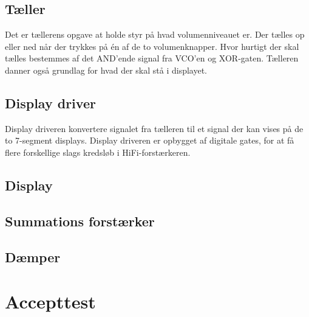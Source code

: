 \subsection{Tæller}
\label{volumenkontrol-simulering-taeller}

Det er tællerens opgave at holde styr på hvad volumenniveauet er. Der tælles op eller ned når der trykkes på én af de to volumenknapper. Hvor hurtigt der skal tælles bestemmes af det AND'ende signal fra VCO'en og XOR-gaten. Tælleren danner også grundlag for hvad der skal stå i displayet.

\subsection{Display driver}
\label{volumenkontrol-simulering-display_driver}

Display driveren konvertere signalet fra tælleren til et signal der kan vises på de to 7-segment displays. Display driveren er opbygget af digitale gates, for at få flere forskellige slags kredsløb i HiFi-forstærkeren.

\subsection{Display}
\label{volumenkontrol-simulering-display}



\subsection{Summations forstærker}
\label{volumenkontrol-simulering-summations_forstaerker}



\subsection{Dæmper}
\label{volumenkontrol-simulering-daemper}



\section{Accepttest}
\label{volumenkontrol-accepttest}

